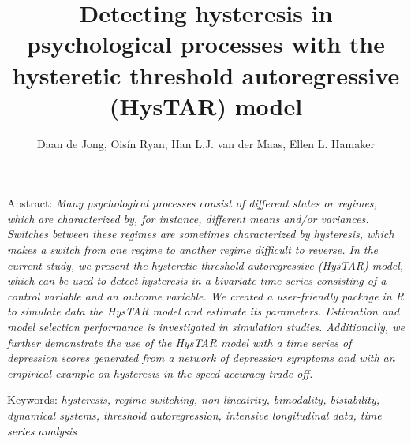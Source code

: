 \documentclass{article}
\title{Detecting hysteresis in psychological processes with the hysteretic threshold autoregressive (HysTAR) model}
\author{Daan de Jong, Ois\'{i}n Ryan, Han L.J. van der Maas, Ellen L. Hamaker}
\begin{document}

%
\maketitle


Abstract:
\textit{
Many psychological processes consist of different states or regimes, which are characterized by, for instance, different means and/or variances. 
Switches between these regimes are sometimes characterized by hysteresis, which makes a switch from one regime to another regime difficult to reverse. 
In the current study, we present the hysteretic threshold autoregressive (HysTAR) model, which can be used to detect hysteresis in a bivariate time series consisting of a control variable and an outcome variable. 
We created a user-friendly package in \textsf{R} to simulate data the HysTAR model and estimate its parameters. 
Estimation and model selection performance is investigated in simulation studies. 
Additionally, we further demonstrate the use of the HysTAR model with a time series of depression scores generated from a network of depression symptoms and with an empirical example on hysteresis in the speed-accuracy trade-off.
}

Keywords: \textit{hysteresis, regime switching, non-lineairity, bimodality, bistability, dynamical systems, threshold autoregression, intensive longitudinal data, time series analysis}
\newpage
\end{document}
